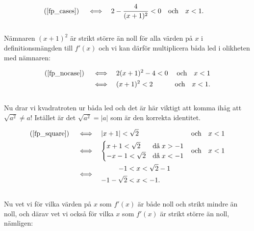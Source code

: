\documentclass{article}
\begin{document}
\begin{align}
  \text{(\ref{fp_cases})} \quad \iff \quad & 2 - \frac{4}{(x+1)^{2}} < 0 \quad \text{och} \quad x < 1\text{.} \label{fp_nocase}
\end{align}
\\
Nämnaren $(x + 1)^{2}$ är strikt större än noll för alla värden på $x$ i definitionsmängden till $f'(x)$ och vi kan därför multiplicera båda led i olikheten med nämnaren:

\begin{align}
  \text{(\ref{fp_nocase})} \quad \iff \quad & 2(x + 1)^{2} - 4 < 0 & \text{och} \quad x < 1 \notag \\
  \iff \quad & (x + 1)^{2} < 2 & \text{och} \quad x < 1\text{.} \label{fp_square}
\end{align}
\\
Nu drar vi kvadratroten ur båda led och det är här viktigt att komma ihåg att $\sqrt{a^{2}} \neq a$! Istället är det $\sqrt{a^{2}} = |a|$ som är den korrekta identitet.

\begin{align*}
  \text{(\ref{fp_square})} \quad \iff \quad & |x + 1| < \sqrt{2} & \text{och} \quad x < 1 \\
  \iff \quad &
               \begin{aligned}
                 \begin{cases}
                   x + 1 < \sqrt{2} & \text{då} \; x > - 1 \\
                   -x -1 < \sqrt{2} & \text{då} \; x < - 1
                 \end{cases}
               \end{aligned}
  & \text{och} \quad x < 1\\
  \iff \quad &
              \begin{aligned}
                -1 &< x < \sqrt{2} - 1 \\
                -1 -\sqrt{2} &< x < - 1\text{.}
              \end{aligned}
\end{align*}
\\
Nu vet vi för vilka värden på $x$ som $f'(x)$ är både noll och strikt mindre än noll, och därav vet vi också för vilka $x$ som $f'(x)$ är strikt större än noll, nämligen:
\end{document}
